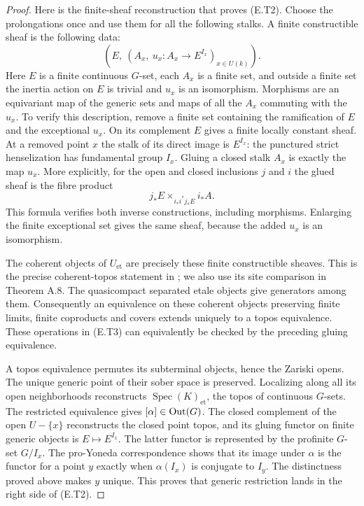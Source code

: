 \begin{proof}
Here is the finite-sheaf reconstruction that proves (E.T2).  Choose
the prolongations once and use them for all the following stalks.
A finite constructible sheaf is the following data:
\[
 \left(E,\ (A_x,\ u_x:A_x\longrightarrow E^{I_x})_{x\in U(k)}\right).
 \tag{E.T3}
\]
Here $E$ is a finite continuous $G$-set, each $A_x$ is a finite set,
and outside a finite set the inertia action on $E$ is trivial and
$u_x$ is an isomorphism.  Morphisms are an equivariant map of the
generic sets and maps of all the $A_x$ commuting with the $u_x$.
To verify this description, remove a finite set containing the
ramification of $E$ and the exceptional $u_x$.  On its complement
$E$ gives a finite locally constant sheaf.  At a removed point $x$
the stalk of its direct image is $E^{I_x}$: the punctured strict
henselization has fundamental group $I_x$.  Gluing a closed stalk
$A_x$ is exactly the map $u_x$.  More explicitly, for the open and
closed inclusions $j$ and $i$ the glued sheaf is the fibre product
\[
             j_*E\times_{i_*i^*j_*E}i_*A.
\]
This formula verifies both inverse constructions, including
morphisms.  Enlarging the finite exceptional set gives the same
sheaf, because the added $u_x$ is an isomorphism.

The coherent objects of $U_{\mathrm{et}}$ are precisely these finite
constructible sheaves.  This is the precise coherent-topos statement
in \cite[Example A.6 and Corollary A.9]{CarlsonHaineWolf2024}; we
also use its site comparison in Theorem A.8.  The quasicompact
separated etale objects give generators among them.  Consequently
an equivalence on these coherent objects preserving finite limits,
finite coproducts and covers extends uniquely to a topos
equivalence.  These operations in (E.T3) can equivalently be
checked by the preceding gluing equivalence.

A topos equivalence permutes its subterminal objects, hence the
Zariski opens.  The unique generic point of their sober space is
preserved.  Localizing along all its open neighborhoods reconstructs
$\operatorname{Spec}(K)_{\mathrm{et}}$, the topos of continuous
$G$-sets.  The restricted equivalence gives $[\alpha]\in\operatorname{Out}(G)$.
The closed complement of the open $U-\{x\}$ reconstructs the closed
point topos, and its gluing functor on finite generic objects is
$E\mapsto E^{I_x}$.  The latter functor is represented by the
profinite $G$-set $G/I_x$.  The pro-Yoneda correspondence shows that
its image under $\alpha$ is the functor for a point $y$ exactly when
$\alpha(I_x)$ is conjugate to $I_y$.  The distinctness proved above
makes $y$ unique.  This proves that generic restriction lands in
the right side of (E.T2).


\end{proof}
